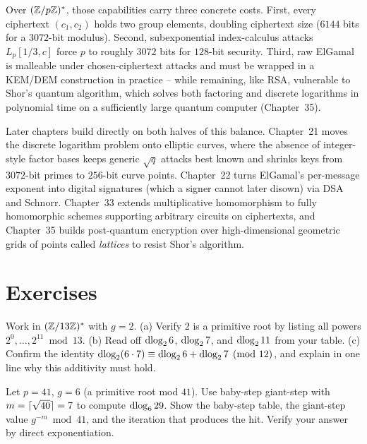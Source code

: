 \begin{trapbox}
Over $(\mathbb{Z}/p\mathbb{Z})^{*}$, those capabilities carry three concrete costs. First, every ciphertext $(c_1, c_2)$ holds two group elements, doubling ciphertext size ($6144$ bits for a $3072$-bit modulus). Second, subexponential index-calculus attacks $L_p[1/3, c]$ force $p$ to roughly $3072$ bits for $128$-bit security. Third, raw ElGamal is malleable under chosen-ciphertext attacks and must be wrapped in a KEM/DEM construction in practice -- while remaining, like RSA, vulnerable to Shor's quantum algorithm, which solves both factoring and discrete logarithms in polynomial time on a sufficiently large quantum computer (Chapter~35).
\end{trapbox}

\begin{connectionbox}
Later chapters build directly on both halves of this balance. Chapter~21 moves the discrete logarithm problem onto elliptic curves, where the absence of integer-style factor bases keeps generic $\sqrt{q}$ attacks best known and shrinks keys from $3072$-bit primes to $256$-bit curve points. Chapter~22 turns ElGamal's per-message exponent into digital signatures (which a signer cannot later disown) via DSA and Schnorr. Chapter~33 extends multiplicative homomorphism to fully homomorphic schemes supporting arbitrary circuits on ciphertexts, and Chapter~35 builds post-quantum encryption over high-dimensional geometric grids of points called \emph{lattices} to resist Shor's algorithm.
\end{connectionbox}

\section{Exercises}
\label{ch20:exercises}

\begin{exercise}
\label{ch20:exc-table}
Work in $(\mathbb{Z}/13\mathbb{Z})^{*}$ with $g = 2$. (a) Verify $2$ is a primitive root by listing all powers
$2^0,\dots,2^{11} \bmod 13$. (b) Read off $\operatorname{dlog}_2 6$, $\operatorname{dlog}_2 7$, and $\operatorname{dlog}_2 11$ from your table.
(c) Confirm the identity $\operatorname{dlog}_2(6\cdot 7) \equiv \operatorname{dlog}_2 6 + \operatorname{dlog}_2 7 \pmod{12}$, and explain in
one line why this additivity must hold.
\end{exercise}

\begin{exercise}
\label{ch20:exc-bsgs}
Let $p = 41$, $g = 6$ (a primitive root mod $41$). Use baby-step giant-step with $m = \lceil\sqrt{40}\rceil
= 7$ to compute $\operatorname{dlog}_6 29$. Show the baby-step table, the giant-step value $g^{-m} \bmod 41$, and
the iteration that produces the hit. Verify your answer by direct exponentiation.
\end{exercise}

